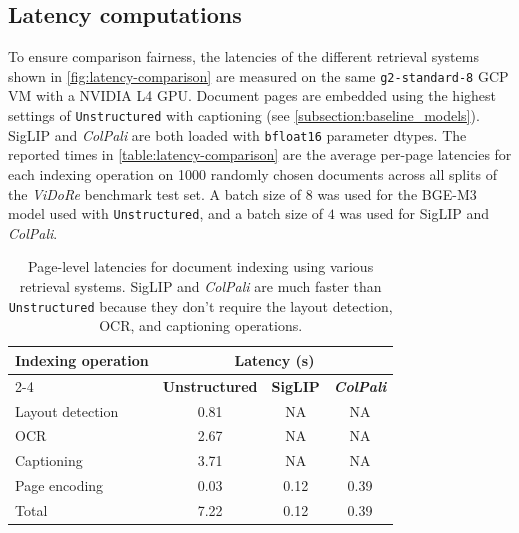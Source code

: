 \documentclass{article} %
\newcommand{\code}[1]{\texttt{#1}}
\begin{document}
\subsection{Latency computations}
\label{paragraph:lantency_app} 
To ensure comparison fairness, the latencies of the different retrieval systems shown in \autoref{fig:latency-comparison} are measured on the same \code{g2-standard-8} GCP VM with a NVIDIA L4 GPU. Document pages are embedded using the highest settings of \code{Unstructured} with captioning (see \autoref{subsection:baseline_models}). SigLIP and \textit{ColPali} are both loaded with \code{bfloat16} parameter dtypes. The reported times in \autoref{table:latency-comparison} are the average per-page latencies for each indexing operation on 1000 randomly chosen documents across all splits of the \textit{ViDoRe} benchmark test set. A batch size of $8$ was used for the BGE-M3 model used with \code{Unstructured}, and a batch size of $4$ was used for SigLIP and \textit{ColPali}.

\begin{table}[ht]
    \centering
    \begin{tabular}{l|c|c|c}
    \multirow{2}{*}{\textbf{Indexing operation}} & \multicolumn{3}{c}{\textbf{Latency (s)}}                                                                      \\ \cline{2-4} 
                                                 & \multicolumn{1}{l|}{\textbf{Unstructured}} & \multicolumn{1}{l|}{\textbf{SigLIP}} & \textit{\textbf{ColPali}} \\
    \hline
    Layout detection                             & \multicolumn{1}{c|}{0.81}                  & \multicolumn{1}{c|}{NA}              & NA                                            \\
    OCR                                          & \multicolumn{1}{c|}{2.67}                  & \multicolumn{1}{c|}{NA}              & NA                                            \\
    Captioning                                   & \multicolumn{1}{c|}{3.71}                  & \multicolumn{1}{c|}{NA}              & NA                                            \\
    Page encoding                                & \multicolumn{1}{c|}{0.03}                  & \multicolumn{1}{c|}{0.12}            & 0.39                                          \\ \hline
    Total                                        & \multicolumn{1}{c|}{7.22}                  & \multicolumn{1}{c|}{0.12}            & 0.39
    \end{tabular}
    \caption{Page-level latencies for document indexing using various retrieval systems. SigLIP and \textit{ColPali} are much faster than \code{Unstructured} because they don't require the layout detection, OCR, and captioning operations.}
    \label{table:latency-comparison}
\end{table}
\end{document}
